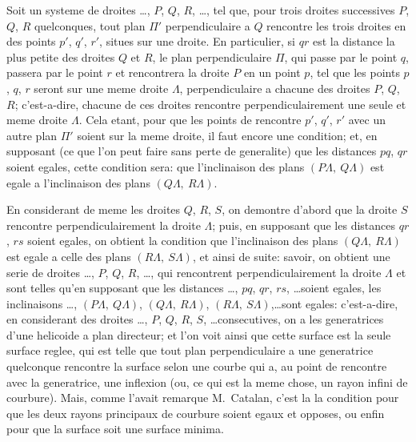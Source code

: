 \documentclass[11pt,a4paper]{article}
\theoremstyle{plain}
\theoremstyle{definition}
\begin{document}
Soit un systeme de droites \ldots, $P$, $Q$, $R$, \ldots, tel que, pour trois droites successives $P$, $Q$, $R$ quelconques, tout plan $\Pi'$ perpendiculaire a $Q$ rencontre les trois droites en des points $p'$, $q'$, $r'$, situes sur une droite. En particulier, si $qr$ est la distance la plus petite des droites $Q$ et $R$, le plan perpendiculaire $\Pi$, qui passe par le point $q$, passera par le point $r$ et rencontrera la droite $P$ en un point $p$, tel que les points $p$, $q$, $r$ seront sur une meme droite $\Lambda$, perpendiculaire a chacune des droites $P$, $Q$, $R$; c'est-a-dire, chacune de ces droites rencontre perpendiculairement une seule et meme droite $\Lambda$. Cela etant, pour que les points de rencontre $p'$, $q'$, $r'$ avec un autre plan $\Pi'$ soient sur la meme droite, il faut encore une condition; et, en supposant (ce que l'on peut faire sans perte de generalite) que les distances $pq$, $qr$ soient egales, cette condition sera: que l'inclinaison des plans $(P\Lambda,\ Q\Lambda)$ est egale a l'inclinaison des plans $(Q\Lambda,\ R\Lambda)$.

En considerant de meme les droites $Q$, $R$, $S$, on demontre d'abord que la droite $S$ rencontre perpendiculairement la droite $\Lambda$; puis, en supposant que les distances $qr$, $rs$ soient egales, on obtient la condition que l'inclinaison des plans $(Q\Lambda,\ R\Lambda)$ est egale a celle des plans $(R\Lambda,\ S\Lambda)$, et ainsi de suite: savoir, on obtient une serie de droites \ldots, $P$, $Q$, $R$, \ldots, qui rencontrent perpendiculairement la droite $\Lambda$ et sont telles qu'en supposant que les distances \ldots, $pq$, $qr$, $rs$, \ldots soient egales, les inclinaisons \ldots, $(P\Lambda,\ Q\Lambda)$, $(Q\Lambda,\ R\Lambda)$, $(R\Lambda,\ S\Lambda)$,\ldots sont egales: c'est-a-dire, en considerant des droites \ldots, $P$, $Q$, $R$, $S$, \ldots consecutives, on a les generatrices d'une helicoide a plan directeur; et l'on voit ainsi que cette surface est la seule surface reglee, qui est telle que tout plan perpendiculaire a une generatrice quelconque rencontre la surface selon une courbe qui a, au point de rencontre avec la generatrice, une inflexion (ou, ce qui est la meme chose, un rayon infini de courbure). Mais, comme l'avait remarque M.~Catalan, c'est la la condition pour que les deux rayons principaux de courbure soient egaux et opposes, ou enfin pour que la surface soit une surface minima.
\end{document}
